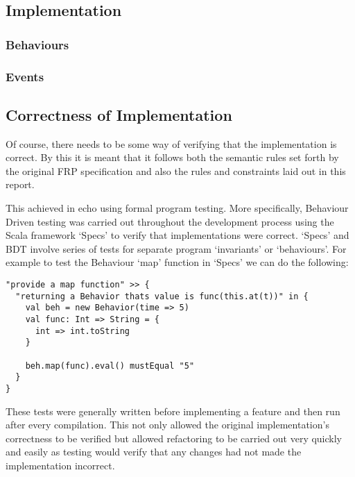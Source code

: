 \documentclass[12pt]{article}
\begin{document}
      
    \subsection{Implementation}
    
      \subsubsection{Behaviours} 
        
      \subsubsection{Events}
        
    
    \subsection{Correctness of Implementation}
      Of course, there needs to be some way of verifying that the implementation is correct. By
      this it is meant that it follows both the semantic rules set forth by the original FRP specification
      and also the rules and constraints laid out in this report.
      
      This achieved in echo using formal program testing. More specifically, Behaviour Driven
      testing was carried out throughout the development process using the Scala framework `Specs'
      to verify that implementations were correct. `Specs' and BDT involve series of tests for
      separate program `invariants' or `behaviours'. For example to test the Behaviour `map' function
      in `Specs' we can do the following:
 
\begin{verbatim}
"provide a map function" >> {
  "returning a Behavior thats value is func(this.at(t))" in {
    val beh = new Behavior(time => 5)
    val func: Int => String = {
      int => int.toString
    }

    beh.map(func).eval() mustEqual "5"
  }
}
\end{verbatim}      

    These tests were generally written before implementing a feature and then run after every compilation. 
    This not only allowed the original implementation's correctness to be verified but
    allowed refactoring to be carried out very quickly and easily as testing would verify that any changes had not
    made the implementation incorrect.
      
\end{document}
